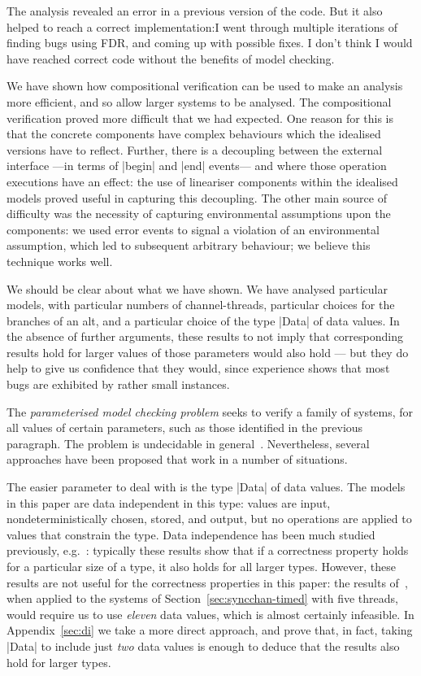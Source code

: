 The analysis revealed an error in a previous version of the code.  But it also
helped to reach a correct implementation:I went through multiple iterations of
finding bugs using FDR, and coming up with possible fixes.  I don't think I
would have reached correct code without the benefits of model checking. 

We have shown how compositional
verification can be used to make an analysis more efficient, and so allow
larger systems to be analysed.
%
The compositional verification proved more difficult that we had expected.
One reason for this is that the concrete components have complex behaviours
which the idealised versions have to reflect.  Further, there is a decoupling
between the external interface ---in terms of |begin| and |end| events--- and
where those operation executions have an effect: the use of lineariser
components within the idealised models proved useful in capturing this
decoupling.  The other main source of difficulty was the necessity of
capturing environmental assumptions upon the components: we used error events
to signal a violation of an environmental assumption, which led to subsequent
arbitrary behaviour; we believe this technique works well.

We should be clear about what we have shown.  We have analysed particular
models, with particular numbers of channel-threads, particular choices for the
branches of an alt, and a particular choice of the type |Data| of data values.
In the absence of further arguments, these results to not imply that
corresponding results hold for larger values of those parameters would also
hold --- but they do help to give us confidence that they would, since
experience shows that most bugs are exhibited by rather small instances.

The \emph{parameterised model checking problem} seeks to verify a family of
systems, for all values of certain parameters, such as those identified in the
previous paragraph.  The problem is undecidable in general~\cite{apt-kozen,
  tomasz-gavin-CA}.  Nevertheless, several approaches have been proposed that
work in a number of situations.

The easier parameter to deal with is the type |Data| of data values.  The
models in this paper are data independent in this type: values are input,
nondeterministically chosen, stored, and output, but no operations are applied
to values that constrain the type.  Data independence has been much studied
previously, e.g.~\cite{Wolper-1986, ranko-thesis}: typically these results
show that if a correctness property holds for a particular size of a type, it
also holds for all larger types.  However, these results are not useful for
the correctness properties in this paper: the results
of~\cite[Section~15.2]{awr:TPC}, when applied to the systems of
Section~\ref{sec:syncchan-timed} with five threads, would require us to use
\emph{eleven} data values, which is almost certainly infeasible.  In
Appendix~\ref{sec:di} we take a more direct approach, and prove that, in fact,
taking |Data| to include just \emph{two} data values is enough to deduce that
the results also hold for larger types.

